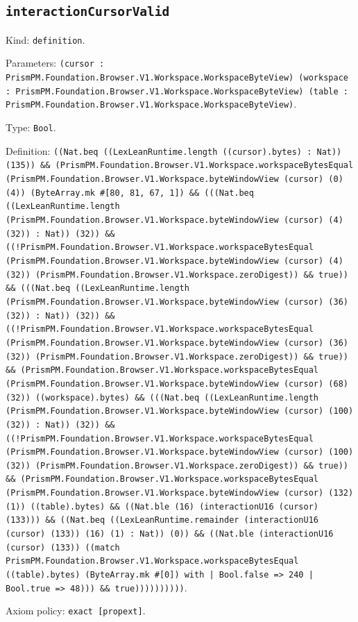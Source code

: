 \documentclass[11pt]{article}
\begin{document}
\subsection*{\texttt{interactionCursorValid}}
\noindent Kind: \texttt{definition}.\par
\noindent Parameters: \texttt{(cursor : PrismPM.Foundation.Browser.V1.Workspace.WorkspaceByteView) (workspace : PrismPM.Foundation.Browser.V1.Workspace.WorkspaceByteView) (table : PrismPM.Foundation.Browser.V1.Workspace.WorkspaceByteView)}.\par
\noindent Type: \texttt{Bool}.\par
\noindent Definition: \texttt{((Nat.beq ((LexLeanRuntime.length ((cursor).bytes) : Nat)) (135)) \&\& (PrismPM.Foundation.Browser.V1.Workspace.workspaceBytesEqual (PrismPM.Foundation.Browser.V1.Workspace.byteWindowView (cursor) (0) (4)) (ByteArray.mk \#[80, 81, 67, 1]) \&\& (((Nat.beq ((LexLeanRuntime.length (PrismPM.Foundation.Browser.V1.Workspace.byteWindowView (cursor) (4) (32)) : Nat)) (32)) \&\& ((!PrismPM.Foundation.Browser.V1.Workspace.workspaceBytesEqual (PrismPM.Foundation.Browser.V1.Workspace.byteWindowView (cursor) (4) (32)) (PrismPM.Foundation.Browser.V1.Workspace.zeroDigest)) \&\& true)) \&\& (((Nat.beq ((LexLeanRuntime.length (PrismPM.Foundation.Browser.V1.Workspace.byteWindowView (cursor) (36) (32)) : Nat)) (32)) \&\& ((!PrismPM.Foundation.Browser.V1.Workspace.workspaceBytesEqual (PrismPM.Foundation.Browser.V1.Workspace.byteWindowView (cursor) (36) (32)) (PrismPM.Foundation.Browser.V1.Workspace.zeroDigest)) \&\& true)) \&\& (PrismPM.Foundation.Browser.V1.Workspace.workspaceBytesEqual (PrismPM.Foundation.Browser.V1.Workspace.byteWindowView (cursor) (68) (32)) ((workspace).bytes) \&\& (((Nat.beq ((LexLeanRuntime.length (PrismPM.Foundation.Browser.V1.Workspace.byteWindowView (cursor) (100) (32)) : Nat)) (32)) \&\& ((!PrismPM.Foundation.Browser.V1.Workspace.workspaceBytesEqual (PrismPM.Foundation.Browser.V1.Workspace.byteWindowView (cursor) (100) (32)) (PrismPM.Foundation.Browser.V1.Workspace.zeroDigest)) \&\& true)) \&\& (PrismPM.Foundation.Browser.V1.Workspace.workspaceBytesEqual (PrismPM.Foundation.Browser.V1.Workspace.byteWindowView (cursor) (132) (1)) ((table).bytes) \&\& ((Nat.ble (16) (interactionU16 (cursor) (133))) \&\& ((Nat.beq ((LexLeanRuntime.remainder (interactionU16 (cursor) (133)) (16) (1) : Nat)) (0)) \&\& ((Nat.ble (interactionU16 (cursor) (133)) ((match PrismPM.Foundation.Browser.V1.Workspace.workspaceBytesEqual ((table).bytes) (ByteArray.mk \#[0]) with | Bool.false => 240 | Bool.true => 48))) \&\& true))))))))))}.\par
\noindent Axiom policy: \texttt{exact [propext]}.\par
\end{document}
